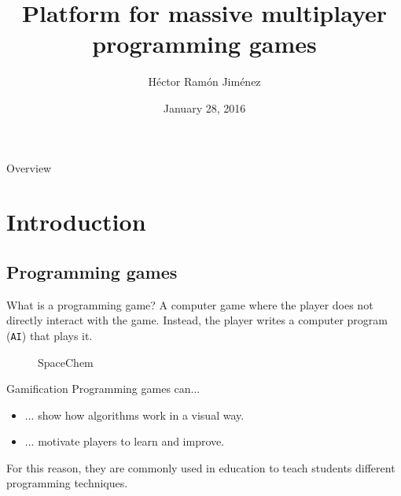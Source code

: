 \documentclass{beamer}
\title{Platform for massive multiplayer programming games}
\institute{Facultat d'Informàtica de Barcelona}
\author{Héctor Ramón Jiménez}
\date{January 28, 2016}
\begin{document}
\frame{\titlepage}
\begin{frame}{Overview}
\tableofcontents
\end{frame}
\section{Introduction}
\subsection{Programming games}
\begin{frame}{What is a programming game?}
A computer game where the player does not directly interact with the game. Instead, the player writes a computer program
    (\texttt{AI}) that plays it.
\begin{figure}[H]
\begin{center}
\noindent{}
\end{center}
\caption{SpaceChem}
\end{figure}
\end{frame}
\begin{frame}{Gamification}
Programming games can...
\begin{itemize}
\item
... show how algorithms work in a visual way.
\item
... motivate players to learn and improve.
\end{itemize}
For this reason, they are commonly used in education to teach students different programming techniques.
\end{frame}
\end{document}
